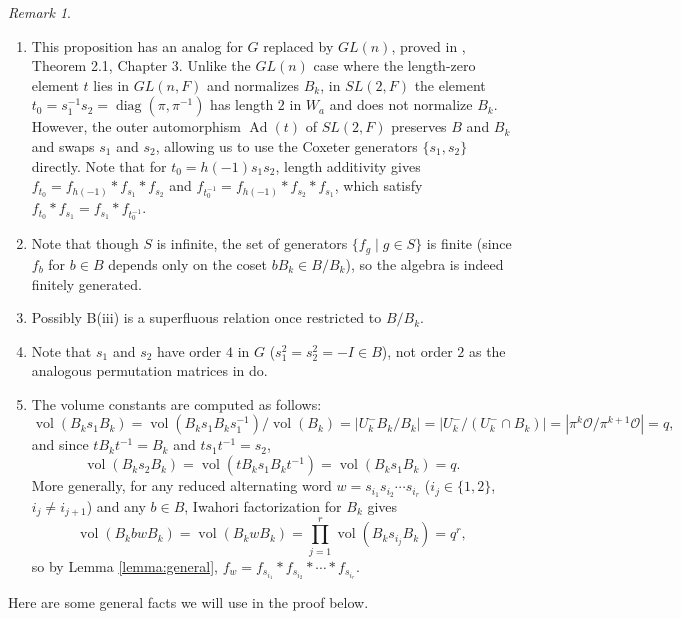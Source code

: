 \documentclass[12pt,letterpaper,reqno]{amsart}
\let\cal\mathcal
\theoremstyle{definition}
\theoremstyle{remark}
\newtheorem{remark}[theorem]{Remark}
\numberwithin{equation}{section}
\begin{document}
\begin{remark}
\label{rem:1}
\begin{enumerate}
\item This proposition has an analog for $G$ replaced by $GL(n)$, proved in
\cite{HM85}, Theorem 2.1, Chapter 3. Unlike the $GL(n)$ case where the length-zero
element $t$ lies in $GL(n,F)$ and normalizes $B_k$, in $SL(2,F)$ the element
$t_0=s_1^{-1}s_2=\operatorname{diag}(\pi,\pi^{-1})$ has length $2$ in $W_a$
and does not normalize $B_k$. However, the outer automorphism
$\operatorname{Ad}(t)$ of $SL(2,F)$ preserves $B$ and $B_k$ and swaps $s_1$
and $s_2$, allowing us to use the Coxeter generators $\{s_1,s_2\}$ directly.
Note that for $t_0=h(-1)s_1s_2$, length additivity gives
$f_{t_0}=f_{h(-1)}*f_{s_1}*f_{s_2}$ and
$f_{t_0^{-1}}=f_{h(-1)}*f_{s_2}*f_{s_1}$, which satisfy
$f_{t_0}*f_{s_1}=f_{s_1}*f_{t_0^{-1}}$.

\item Note that though $S$ is infinite, the set of generators
$\{f_g \mid g\in S\}$ is finite (since $f_b$ for $b\in B$ depends only on the
coset $bB_k\in B/B_k$), so the algebra is indeed finitely generated.

\item Possibly B(iii) is a superfluous relation once restricted to $B/B_k$.

\item Note that $s_1$ and $s_2$ have order $4$ in $G$ ($s_1^2=s_2^2=-I\in B$),
not order $2$ as the analogous permutation matrices in \cite{HM85} do.

\item The volume constants are computed as follows:
\[
\operatorname{vol}(B_k s_1 B_k)
=\operatorname{vol}(B_k s_1 B_k s_1^{-1})/\operatorname{vol}(B_k)
=|U_k^- B_k/B_k|=|U_k^-/(U_k^-\cap B_k)|=|\pi^k{\cal O}/\pi^{k+1}{\cal O}|=q,
\]
and since $tB_kt^{-1}=B_k$ and $ts_1t^{-1}=s_2$,
\[
\operatorname{vol}(B_k s_2 B_k)
=\operatorname{vol}(t B_k s_1 B_k t^{-1})
=\operatorname{vol}(B_k s_1 B_k)=q.
\]
More generally, for any reduced alternating word $w=s_{i_1}s_{i_2}\cdots s_{i_r}$
($i_j\in\{1,2\}$, $i_j\neq i_{j+1}$) and any $b\in B$, Iwahori factorization
for $B_k$ gives
\[
\operatorname{vol}(B_k b w B_k)=\operatorname{vol}(B_k w B_k)
=\prod_{j=1}^r \operatorname{vol}(B_k s_{i_j} B_k)=q^r,
\]
so by Lemma \ref{lemma:general},
$f_w=f_{s_{i_1}}*f_{s_{i_2}}*\cdots *f_{s_{i_r}}$.
\end{enumerate}
\end{remark}

Here are some general facts we will use in the proof below.
\end{document}

